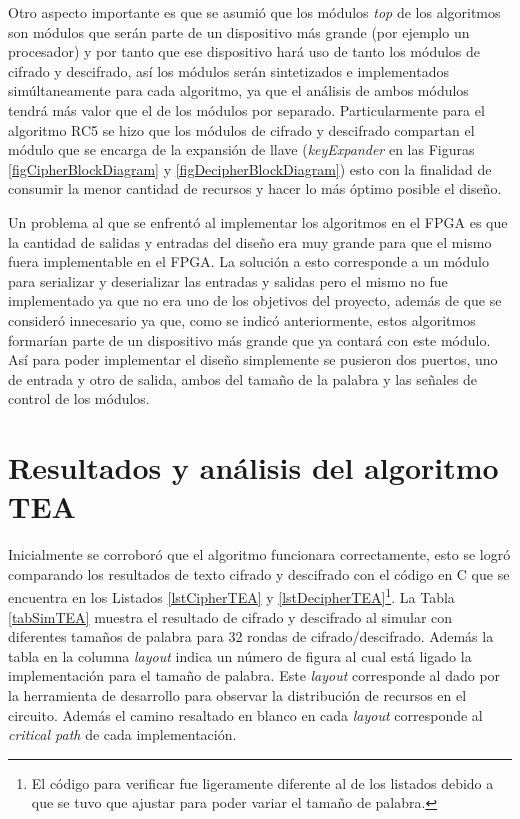 Otro aspecto importante es que se asumió que los módulos \textit{top} de los algoritmos son módulos que serán parte de un dispositivo más grande (por ejemplo un procesador) y por tanto que ese dispositivo hará uso de tanto los módulos de cifrado y descifrado, así los módulos serán sintetizados e implementados simúltaneamente para cada algoritmo, ya que el análisis de ambos módulos tendrá más valor que el de los módulos por separado. Particularmente para el algoritmo RC5 se hizo que los módulos de cifrado y descifrado compartan el módulo que se encarga de la expansión de llave (\textit{keyExpander} en las Figuras \ref{figCipherBlockDiagram} y \ref{figDecipherBlockDiagram}) esto con la finalidad de consumir la menor cantidad de recursos y hacer lo más óptimo posible el diseño.


Un problema al que se enfrentó al implementar los algoritmos en el FPGA es que la cantidad de salidas y entradas del diseño era muy grande para que el mismo fuera implementable en el FPGA. La solución a esto corresponde a un módulo para serializar y deserializar las entradas y salidas pero el mismo no fue implementado ya que no era uno de los objetivos del proyecto, además de que se consideró innecesario ya que, como se indicó anteriormente, estos algoritmos formarían parte de un dispositivo más grande que ya contará con este módulo. Así para poder implementar el diseño simplemente se pusieron dos puertos, uno de entrada y otro de salida, ambos del tamaño de la palabra y las señales de control de los módulos.

\section{Resultados y análisis del algoritmo TEA} \label{resultadosAnalisisTEA}
Inicialmente se corroboró que el algoritmo funcionara correctamente, esto se logró comparando los resultados de texto cifrado y descifrado con el código en C que se encuentra en los Listados \ref{lstCipherTEA} y \ref{lstDecipherTEA}\footnote{El código para verificar fue ligeramente diferente al de los listados debido a que se tuvo que ajustar para poder variar el tamaño de palabra.}. La Tabla \ref{tabSimTEA} muestra el resultado de cifrado y descifrado al simular con diferentes tamaños de palabra para 32 rondas de cifrado/descifrado. Además la tabla en la columna \textit{layout} indica un número de figura al cual está ligado la implementación para el tamaño de palabra. Este \textit{layout} corresponde al dado por la herramienta de desarrollo para observar la distribución de recursos en el circuito. Además el camino resaltado en blanco en cada \textit{layout} corresponde al \textit{critical path} de cada implementación.

